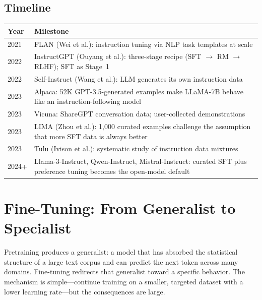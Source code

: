 \subsection*{Timeline}

\begin{center}
\begin{tabularx}{\textwidth}{@{}lX@{}}
\toprule
\textbf{Year} & \textbf{Milestone} \\
\midrule
2021 & FLAN (Wei et al.): instruction tuning via NLP task templates at scale \\
2022 & InstructGPT (Ouyang et al.): three-stage recipe (SFT $\to$ RM $\to$ RLHF); SFT as Stage~1 \\
2022 & Self-Instruct (Wang et al.): LLM generates its own instruction data \\
2023 & Alpaca: 52K GPT-3.5-generated examples make LLaMA-7B behave like an instruction-following model \\
2023 & Vicuna: ShareGPT conversation data; user-collected demonstrations \\
2023 & LIMA (Zhou et al.): 1{,}000 curated examples challenge the assumption that more SFT data is always better \\
2023 & Tulu (Ivison et al.): systematic study of instruction data mixtures \\
2024+ & Llama-3-Instruct, Qwen-Instruct, Mistral-Instruct: curated SFT plus preference tuning becomes the open-model default \\
\bottomrule
\end{tabularx}
\end{center}



\section{Fine-Tuning: From Generalist to Specialist}
\label{sec:finetuning-landscape}

Pretraining produces a generalist: a model that has absorbed the statistical structure of a large text corpus and can predict the next token across many domains. Fine-tuning redirects that generalist toward a specific behavior. The mechanism is simple---continue training on a smaller, targeted dataset with a lower learning rate---but the consequences are large.


